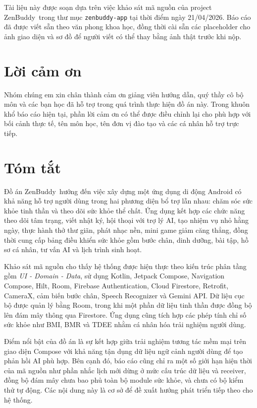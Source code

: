 \documentclass{zenbuddy-report}
\newcommand{\appname}{ZenBuddy}
\begin{document}
\makereporttitle


\begin{reportnote}
Tài liệu này được soạn dựa trên việc khảo sát mã nguồn của project \appname\ trong thư mục \texttt{zenbuddy-app} tại thời điểm ngày 21/04/2026. Báo cáo đã được viết sẵn theo văn phong khoa học, đồng thời cài sẵn các placeholder cho ảnh giao diện và sơ đồ để người viết có thể thay bằng ảnh thật trước khi nộp.
\end{reportnote}

\chapter*{Lời cảm ơn}
Nhóm chúng em xin chân thành cảm ơn giảng viên hướng dẫn, quý thầy cô bộ môn và các bạn học đã hỗ trợ trong quá trình thực hiện đồ án này. Trong khuôn khổ báo cáo hiện tại, phần lời cảm ơn có thể được điều chỉnh lại cho phù hợp với bối cảnh thực tế, tên môn học, tên đơn vị đào tạo và các cá nhân hỗ trợ trực tiếp.

\chapter*{Tóm tắt}
Đồ án \appname\ hướng đến việc xây dựng một ứng dụng di động Android có khả năng hỗ trợ người dùng trong hai phương diện bổ trợ lẫn nhau: chăm sóc sức khỏe tinh thần và theo dõi sức khỏe thể chất. Ứng dụng kết hợp các chức năng theo dõi tâm trạng, viết nhật ký, hội thoại với trợ lý AI, tạo nhiệm vụ nhỏ hằng ngày, thực hành thở thư giãn, phát nhạc nền, mini game giảm căng thẳng, đồng thời cung cấp bảng điều khiển sức khỏe gồm bước chân, dinh dưỡng, bài tập, hồ sơ cá nhân, tư vấn AI và lịch trình sinh hoạt.

Khảo sát mã nguồn cho thấy hệ thống được hiện thực theo kiến trúc phân tầng gồm \textit{UI - Domain - Data}, sử dụng Kotlin, Jetpack Compose, Navigation Compose, Hilt, Room, Firebase Authentication, Cloud Firestore, Retrofit, CameraX, cảm biến bước chân, Speech Recognizer và Gemini API. Dữ liệu cục bộ được quản lý bằng Room, trong khi một phần dữ liệu tinh thần được đồng bộ lên đám mây thông qua Firestore. Ứng dụng cũng tích hợp các phép tính chỉ số sức khỏe như BMI, BMR và TDEE nhằm cá nhân hóa trải nghiệm người dùng.

Điểm nổi bật của đồ án là sự kết hợp giữa trải nghiệm tương tác mềm mại trên giao diện Compose với khả năng tận dụng dữ liệu ngữ cảnh người dùng để tạo phản hồi AI phù hợp. Bên cạnh đó, báo cáo cũng chỉ ra một số giới hạn hiện thời của mã nguồn như phần nhắc lịch mới dừng ở mức cấu trúc dữ liệu và receiver, đồng bộ đám mây chưa bao phủ toàn bộ module sức khỏe, và chưa có bộ kiểm thử tự động. Các nội dung này là cơ sở để đề xuất hướng phát triển tiếp theo cho hệ thống.
\end{document}
